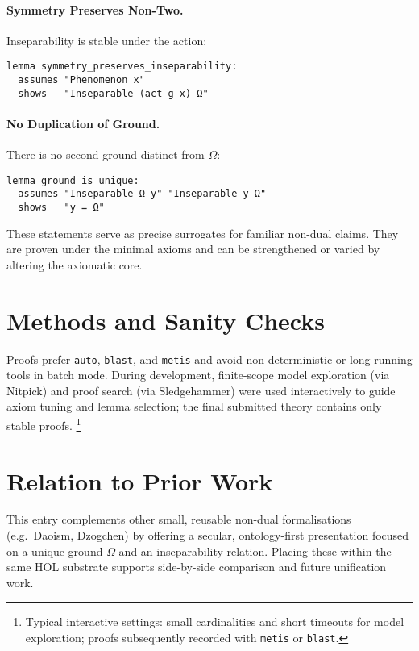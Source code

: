 \documentclass[11pt,a4paper]{article}
\begin{document}
\paragraph{Symmetry Preserves Non-Two.}
Inseparability is stable under the action:
\begin{lstlisting}
lemma symmetry_preserves_inseparability:
  assumes "Phenomenon x"
  shows   "Inseparable (act g x) Ω"
\end{lstlisting}

\paragraph{No Duplication of Ground.}
There is no second ground distinct from \(\Omega\):
\begin{lstlisting}
lemma ground_is_unique:
  assumes "Inseparable Ω y" "Inseparable y Ω"
  shows   "y = Ω"
\end{lstlisting}

These statements serve as precise surrogates for familiar non-dual claims.
They are proven under the minimal axioms and can be strengthened or varied by
altering the axiomatic core.

\section{Methods and Sanity Checks}

Proofs prefer \texttt{auto}, \texttt{blast}, and \texttt{metis} and avoid
non-deterministic or long-running tools in batch mode. During development,
finite-scope model exploration (via Nitpick) and proof search (via Sledgehammer)
were used interactively to guide axiom tuning and lemma selection; the final
submitted theory contains only stable proofs.%
\footnote{Typical interactive settings: small cardinalities and short timeouts
for model exploration; proofs subsequently recorded with \texttt{metis} or
\texttt{blast}.}

\section{Relation to Prior Work}

This entry complements other small, reusable non-dual formalisations (e.g.\
Daoism, Dzogchen) by offering a secular, ontology-first presentation focused on
a unique ground \(\Omega\) and an inseparability relation. Placing these within
the same HOL substrate supports side-by-side comparison and future unification
work.
\end{document}
